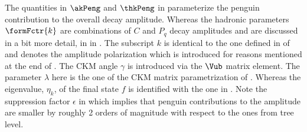 \noindent The quantities in $\akPeng$ and $\thkPeng$ in  parameterize the penguin contribution to the overall \BsJpsiPhi
decay amplitude. Whereas the hadronic parameters $\formFctr{k}$ are combinations of $C$ and $P_q$ decay amplitudes and are discussed
in a bit more detail, in in .
The subscript $k$ is identical to the one defined in  of  and denotes the \BsJpsiPhi
amplitude polarization which is introduced for reasons mentioned at the end of .
The CKM angle $\gamma$ is introduced via the $\Vub$ matrix element. The parameter $\lambda$ here is the one of the
CKM matrix parametrization of . Whereas the eigenvalue, $\eta_k$, of the final state $f$ is identified with the one in .
Note the suppression factor $\epsilon$ in  which implies that penguin contributions to the \BsJpsiPhi amplitude are smaller
by roughly 2 orders of magnitude with respect to the ones from tree level.
